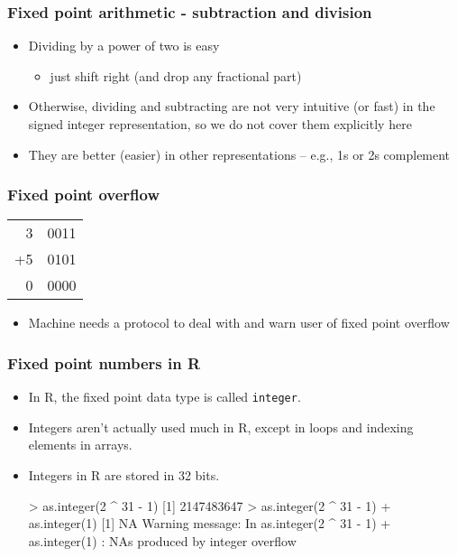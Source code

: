 \documentclass[11pt,a4paper]{article}
\newcommand{\bc}{\begin{center}}
\newcommand{\ec}{\end{center}}
\begin{document}
\begin{frame} [fragile]
	\frametitle{Fixed point arithmetic - subtraction and division}

	\begin{itemize}
			\item <1-> Dividing by a power of two is easy 
			\begin{itemize}
				\item <2->just shift right (and drop any fractional part)
			\end{itemize}
	    \item <3-> Otherwise, dividing and subtracting are not very intuitive (or fast) in the signed integer representation, so we do not cover them explicitly here
			\item <3-> They are better (easier) in other representations -- e.g., 1s or 2s complement
	\end{itemize}

\end{frame}

\begin{frame}[fragile]
	\frametitle{Fixed point overflow}

    \bc
    \begin{tabular}{rr}
        3  & 0011\\
        +5 & 0101\\
        \cline{1-2}
        0  & 0000
    \end{tabular}
    \ec
\begin{itemize}
    \item <2->Machine needs a protocol to deal with and warn user of fixed point overflow
\end{itemize}
\end{frame}

\begin{frame}[fragile]
	\frametitle{Fixed point numbers in R}

\begin{itemize}
    \item <1->In R, the fixed point data type is called \texttt{integer}.
		\item <2->Integers aren't actually used much in R, except in loops and indexing elements in arrays.
		\item <3->Integers in R are stored in 32 bits.
\begin{semiverbatim}
> as.integer(2 ^ 31 - 1)
[1] 2147483647
> as.integer(2 ^ 31 - 1) + as.integer(1)
[1] NA
Warning message:
In as.integer(2 ^ 31 - 1) + as.integer(1) : NAs produced by integer overflow\end{semiverbatim}
\end{itemize}
\end{frame}
\end{document}
